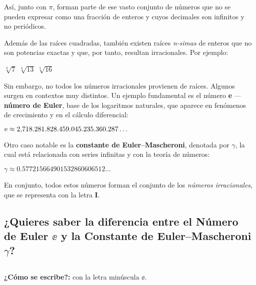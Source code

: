 {Así, junto con $\pi$, forman parte de ese vasto conjunto de números que no se pueden expresar
como una fracción de enteros y cuyos decimales son infinitos y no periódicos.

Además de las raíces cuadradas, también existen raíces \textit{n-simas} de enteros que no son 
potencias exactas y que, por tanto, resultan irracionales.  
Por ejemplo:  

\begin{ejemplosplain}[3]
  \task $\sqrt[3]{7}$
  \task $\sqrt[4]{13}$
  \task $\sqrt[5]{16}$
\end{ejemplosplain}


Sin embargo, no todos los números irracionales provienen de raíces.  
Algunos surgen en contextos muy distintos.  
Un ejemplo fundamental es el número \textbf{e} --- \textbf{número de Euler}, base de los logaritmos 
naturales, que aparece en fenómenos de crecimiento y en el cálculo diferencial:  

\begin{ejemplosplain}
  \task $\ee \approx \numes{2.718281828459045235360287}\ldots$
\end{ejemplosplain}

Otro caso notable es la \textbf{constante de Euler--Mascheroni}, denotada por $\gamma$, la cual 
está relacionada con series infinitas y con la teoría de números:  

\begin{ejemplosplain}
  \task $\gamma \approx \num{0.577215664901532860606512}\ldots$
\end{ejemplosplain}

En conjunto, todos estos números forman el conjunto de los \textit{números irracionales}, 
que se representa con la letra $\mathbf{I}$.

\subsection*{¿Quieres saber la diferencia entre el Número de Euler $\ee$ y la Constante de Euler--Mascheroni $\gamma$?}

\begin{extrabox}
\subsection*{}
\vspace{0.85ex}
\textbf{¿Cómo se escribe?:} con la letra minúscula $\ee$.


\end{extrabox}}

